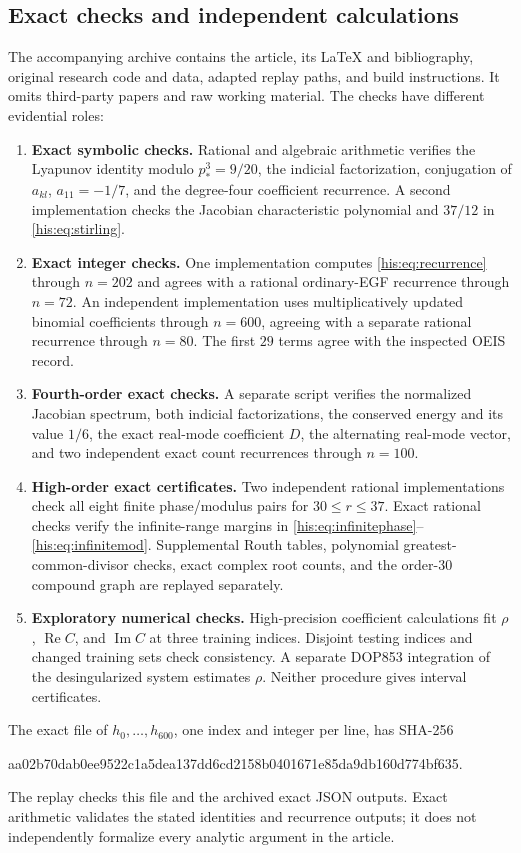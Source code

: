 \documentclass[11pt]{article}
\theoremstyle{remark}\newtheorem{remark}[theorem]{Remark}
\DeclareMathOperator{\Rea}{Re}
\DeclareMathOperator{\Ima}{Im}
\numberwithin{equation}{section}
\begin{document}
\subsection{Exact checks and independent calculations}
The accompanying archive contains the article, its LaTeX and bibliography, original research code and data, adapted replay paths, and build instructions. It omits third-party papers and raw working material. The checks have different evidential roles:
\begin{enumerate}
 \item \textbf{Exact symbolic checks.} Rational and algebraic arithmetic verifies the Lyapunov identity modulo $p_*^3=9/20$, the indicial factorization, conjugation of $a_{kl}$, $a_{11}=-1/7$, and the degree-four coefficient recurrence. A second implementation checks the Jacobian characteristic polynomial and $37/12$ in \eqref{his:eq:stirling}.
 \item \textbf{Exact integer checks.} One implementation computes \eqref{his:eq:recurrence} through $n=202$ and agrees with a rational ordinary-EGF recurrence through $n=72$. An independent implementation uses multiplicatively updated binomial coefficients through $n=600$, agreeing with a separate rational recurrence through $n=80$. The first $29$ terms agree with the inspected OEIS record.
 \item \textbf{Fourth-order exact checks.} A separate script verifies the normalized Jacobian spectrum, both indicial factorizations, the conserved energy and its value $1/6$, the exact real-mode coefficient $D$, the alternating real-mode vector, and two independent exact count recurrences through $n=100$.
 \item \textbf{High-order exact certificates.} Two independent rational implementations check all eight finite phase/modulus pairs for $30\le r\le37$. Exact rational checks verify the infinite-range margins in \eqref{his:eq:infinitephase}--\eqref{his:eq:infinitemod}. Supplemental Routh tables, polynomial greatest-common-divisor checks, exact complex root counts, and the order-$30$ compound graph are replayed separately.
 \item \textbf{Exploratory numerical checks.} High-precision coefficient calculations fit $\rho$, $\Rea C$, and $\Ima C$ at three training indices. Disjoint testing indices and changed training sets check consistency. A separate DOP853 integration of the desingularized system estimates $\rho$. Neither procedure gives interval certificates.
\end{enumerate}
The exact file of $h_0,\ldots,h_{600}$, one index and integer per line, has SHA-256
\begin{center}\small\ttfamily
 aa02b70dab0ee9522c1a5dea137dd6cd2158b0401671e85da9db160d774bf635.
\end{center}
The replay checks this file and the archived exact JSON outputs. Exact arithmetic validates the stated identities and recurrence outputs; it does not independently formalize every analytic argument in the article.
\end{document}
